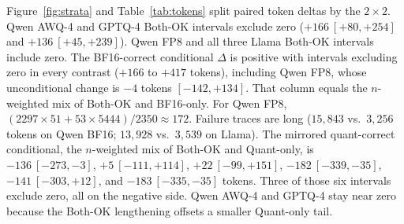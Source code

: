 \documentclass[11pt,a4paper]{article}
\begin{document}
Figure~\ref{fig:strata} and Table~\ref{tab:tokens} split paired token deltas by the $2\times 2$. Qwen AWQ-4 and GPTQ-4 Both-OK intervals exclude zero ($+166\ [+80,+254]$ and $+136\ [+45,+239]$). Qwen FP8 and all three Llama Both-OK intervals include zero. The BF16-correct conditional $\Delta$ is positive with intervals excluding zero in every contrast ($+166$ to $+417$ tokens), including Qwen FP8, whose unconditional change is $-4$ tokens $[-142,+134]$. That column equals the $n$-weighted mix of Both-OK and BF16-only. For Qwen FP8, $(2297\times 51 + 53\times 5444)/2350 \approx 172$. Failure traces are long ($15{,}843$ vs.\ $3{,}256$ tokens on Qwen BF16; $13{,}928$ vs.\ $3{,}539$ on Llama). The mirrored quant-correct conditional, the $n$-weighted mix of Both-OK and Quant-only, is $-136\ [-273,-3]$, $+5\ [-111,+114]$, $+22\ [-99,+151]$, $-182\ [-339,-35]$, $-141\ [-303,+12]$, and $-183\ [-335,-35]$ tokens. Three of those six intervals exclude zero, all on the negative side. Qwen AWQ-4 and GPTQ-4 stay near zero because the Both-OK lengthening offsets a smaller Quant-only tail.
\end{document}

